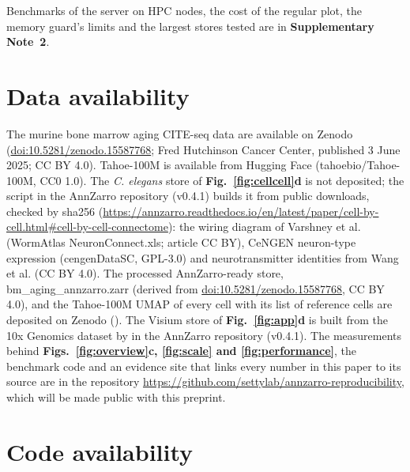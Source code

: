 Benchmarks of the server on HPC nodes, the cost of the regular plot, the memory guard's limits and the largest stores tested are in \textbf{Supplementary Note~2}.

\section{Data availability}

The murine bone marrow aging CITE-seq data are available on Zenodo (\href{https://doi.org/10.5281/zenodo.15587768}{doi:10.5281/zenodo.15587768}; Fred Hutchinson Cancer Center, published 3 June 2025; CC BY 4.0). Tahoe-100M is available from Hugging Face (tahoebio/Tahoe-100M, CC0 1.0)\cite{zhang2025tahoe}. The \textit{C. elegans} store of \textbf{Fig.~\ref{fig:cellcell}d} is not deposited; the script  in the AnnZarro repository (v0.4.1) builds it from public downloads, checked by sha256 (\url{https://annzarro.readthedocs.io/en/latest/paper/cell-by-cell.html\#cell-by-cell-connectome}): the wiring diagram of Varshney et al.\cite{varshney2011} (WormAtlas NeuronConnect.xls; article CC BY), CeNGEN neuron-type expression\cite{taylor2021} (cengenDataSC, GPL-3.0) and neurotransmitter identities from Wang et al.\cite{wang2024nt} (CC BY 4.0). The processed AnnZarro-ready store, bm\_aging\_annzarro.zarr (derived from \href{https://doi.org/10.5281/zenodo.15587768}{doi:10.5281/zenodo.15587768}, CC BY 4.0), and the Tahoe-100M UMAP of every cell with its list of reference cells are deposited on Zenodo (\href{https://doi.org/10.5281/zenodo.23277102}{})\cite{otto2026annzarrodata}. The Visium store of \textbf{Fig.~\ref{fig:app}d} is built from the 10x Genomics dataset by  in the AnnZarro repository (v0.4.1). The measurements behind \textbf{Figs.~\ref{fig:overview}c, \ref{fig:scale} and \ref{fig:performance}}, the benchmark code and an evidence site that links every number in this paper to its source are in the repository \url{https://github.com/settylab/annzarro-reproducibility}, which will be made public with this preprint.

\section{Code availability}

